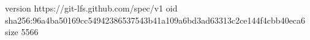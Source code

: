 version https://git-lfs.github.com/spec/v1
oid sha256:96a4ba50169cc54942386537543b41a109a6bd3ad63313c2ce144f4cbb40eca6
size 5566
